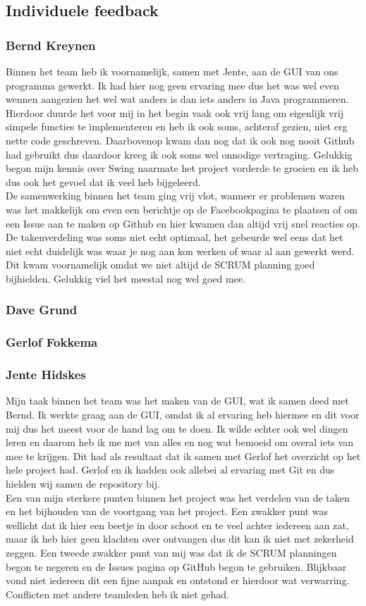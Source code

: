 \documentclass[a4paper,11pt]{article}
\begin{document}
\subsection{Individuele feedback}
\subsubsection{Bernd Kreynen}
Binnen het team heb ik voornamelijk, samen met Jente, aan de GUI van ons programma gewerkt. Ik had hier nog geen ervaring mee dus het was wel even wennen aangezien het wel wat anders is dan iets anders in Java programmeren. Hierdoor duurde het voor mij in het begin vaak ook vrij lang om eigenlijk vrij simpele functies te implementeren en heb ik ook soms, achteraf gezien, niet erg nette code geschreven. Daarbovenop kwam dan nog dat ik ook nog nooit Github had gebruikt dus daardoor kreeg ik ook soms wel onnodige vertraging. Gelukkig begon mijn kennis over Swing naarmate het project vorderde te groeien en ik heb dus ook het gevoel dat ik veel heb bijgeleerd.\\

De samenwerking binnen het team ging vrij vlot, wanneer er problemen waren was het makkelijk om even een berichtje op de Facebookpagina te plaatsen of om een Issue aan te maken op Github en hier kwamen dan altijd vrij snel reacties op. De takenverdeling was soms niet echt optimaal, het gebeurde wel eens dat het niet echt duidelijk was waar je nog aan kon werken of waar al aan gewerkt werd. Dit kwam voornamelijk omdat we niet altijd de SCRUM planning goed bijhielden. Gelukkig viel het meestal nog wel goed mee.
\subsubsection{Dave Grund}
\subsubsection{Gerlof Fokkema}
\subsubsection{Jente Hidskes}
Mijn taak binnen het team was het maken van de GUI, wat ik samen deed met Bernd. Ik werkte graag aan de GUI, omdat ik al ervaring heb hiermee en dit voor mij dus het meest voor de hand lag om te doen. Ik wilde echter ook wel dingen leren en daarom heb ik me met van alles en nog wat bemoeid om overal iets van mee te krijgen. Dit had als resultaat dat ik samen met Gerlof het overzicht op het hele project had. Gerlof en ik hadden ook allebei al ervaring met Git en dus hielden wij samen de repository bij.\\
Een van mijn sterkere punten binnen het project was het verdelen van de taken en het bijhouden van de voortgang van het project. Een zwakker punt was wellicht dat ik hier een beetje in door schoot en te veel achter iedereen aan zat, maar ik heb hier geen klachten over ontvangen dus dit kan ik niet met zekerheid zeggen. Een tweede zwakker punt van mij was dat ik de SCRUM planningen begon te negeren en de Issues pagina op GitHub begon te gebruiken. Blijkbaar vond niet iedereen dit een fijne aanpak en ontstond er hierdoor wat verwarring. Conflicten met andere teamleden heb ik niet gehad.
\end{document}
